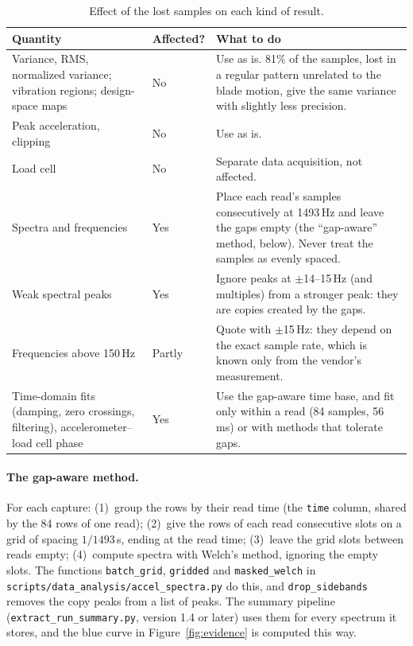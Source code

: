 \documentclass[11pt]{article}
\newcommand{\code}[1]{\texttt{#1}}
\begin{document}
\begin{table}[H]
  \centering
  \begin{tabular}{p{4.6cm}p{2.4cm}p{7.2cm}}
    \toprule
    Quantity & Affected? & What to do \\
    \midrule
    Variance, RMS, normalized variance; vibration regions; design-space
    maps & No &
    Use as is. 81\% of the samples, lost in a regular pattern unrelated to
    the blade motion, give the same variance with slightly less precision. \\
    \addlinespace
    Peak acceleration, clipping & No & Use as is. \\
    \addlinespace
    Load cell & No & Separate data acquisition, not affected. \\
    \addlinespace
    Spectra and frequencies & Yes &
    Place each read's samples consecutively at 1493\,Hz and leave the gaps
    empty (the ``gap-aware'' method, below). Never treat the samples as
    evenly spaced. \\
    \addlinespace
    Weak spectral peaks & Yes &
    Ignore peaks at $\pm$14--15\,Hz (and multiples) from a stronger peak:
    they are copies created by the gaps. \\
    \addlinespace
    Frequencies above 150\,Hz & Partly &
    Quote with $\pm$15\,Hz: they depend on the exact sample rate, which is
    known only from the vendor's measurement. \\
    \addlinespace
    Time-domain fits (damping, zero crossings, filtering), accelerometer--load
    cell phase & Yes &
    Use the gap-aware time base, and fit only within a read (84 samples,
    56\,ms) or with methods that tolerate gaps. \\
    \bottomrule
  \end{tabular}
  \caption{Effect of the lost samples on each kind of result.}
  \label{tab:impact}
\end{table}

\paragraph{The gap-aware method.} For each capture: (1)~group the rows by
their read time (the \code{time} column, shared by the 84 rows of one read);
(2)~give the rows of each read consecutive slots on a grid of spacing
$1/1493$\,s, ending at the read time; (3)~leave the grid slots between reads
empty; (4)~compute spectra with Welch's method, ignoring the empty slots. The
functions \code{batch\_grid}, \code{gridded} and \code{masked\_welch} in
\code{scripts/data\_analysis/accel\_spectra.py} do this, and
\code{drop\_sidebands} removes the copy peaks from a list of peaks. The
summary pipeline (\code{extract\_run\_summary.py}, version 1.4 or later) uses
them for every spectrum it stores, and the blue curve in
Figure~\ref{fig:evidence} is computed this way.
\end{document}
